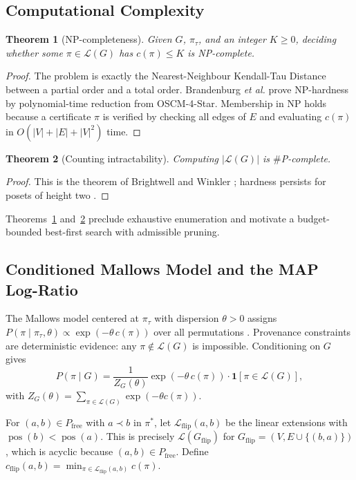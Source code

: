\documentclass{ieeeaccess}
\newtheorem{theorem}{Theorem}
\newcommand{\Pfree}{P_{\mathrm{free}}}
\DeclareMathOperator{\pos}{pos}
\newcommand{\ind}{\mathbf{1}}
\newcommand{\Lin}{\mathcal{L}}
\begin{document}
\subsection{Computational Complexity}
\begin{theorem}[NP-completeness]\label{thm:np}
Given $G$, $\pi_\tau$, and an integer $K\ge 0$, deciding whether some $\pi\in\Lin(G)$ has $c(\pi)\le K$ is NP-complete.
\end{theorem}
\begin{proof}
The problem is exactly the Nearest-Neighbour Kendall-Tau Distance between a partial order and a total order. Brandenburg \emph{et al.} \cite{Brandenburg2011} prove NP-hardness by polynomial-time reduction from OSCM-4-Star. Membership in NP holds because a certificate $\pi$ is verified by checking all edges of $E$ and evaluating $c(\pi)$ in $O(|V|+|E|+|V|^2)$ time.
\end{proof}

\begin{theorem}[Counting intractability]\label{thm:sharpp}
Computing $|\Lin(G)|$ is $\#$P-complete.
\end{theorem}
\begin{proof}
This is the theorem of Brightwell and Winkler \cite{Brightwell1991}; hardness persists for posets of height two \cite{Dittmer2020}.
\end{proof}

Theorems~\ref{thm:np} and~\ref{thm:sharpp} preclude exhaustive enumeration and motivate a budget-bounded best-first search with admissible pruning.

\subsection{Conditioned Mallows Model and the MAP Log-Ratio}
The Mallows model \cite{Mallows1957} centered at $\pi_\tau$ with dispersion $\theta>0$ assigns $P(\pi\mid\pi_\tau,\theta)\propto\exp(-\theta\,c(\pi))$ over all permutations \cite{Lu2011}. Provenance constraints are deterministic evidence: any $\pi\notin\Lin(G)$ is impossible. Conditioning on $G$ gives
\begin{equation}
P(\pi\mid G)=\frac{1}{Z_G(\theta)}\exp(-\theta\,c(\pi))\cdot\ind[\pi\in\Lin(G)],
\end{equation}
with $Z_G(\theta)=\sum_{\pi\in\Lin(G)}\exp(-\theta c(\pi))$.

For $(a,b)\in\Pfree$ with $a\prec b$ in $\pi^*$, let $\Lin_{\mathrm{flip}}(a,b)$ be the linear extensions with $\pos(b)<\pos(a)$. This is precisely $\Lin(G_{\mathrm{flip}})$ for $G_{\mathrm{flip}}=(V,E\cup\{(b,a)\})$, which is acyclic because $(a,b)\in\Pfree$. Define $c_{\mathrm{flip}}(a,b)=\min_{\pi\in\Lin_{\mathrm{flip}}(a,b)}c(\pi)$.
\end{document}
